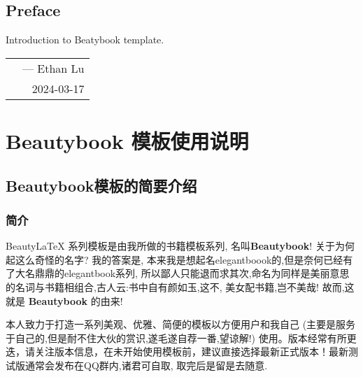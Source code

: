 \documentclass[lang=cn,zihao=-4,a4paper,fontset=windows]{beautybook}
\begin{document}
\frontmatter
{}

{%
\thispagestyle{empty}
\chapter*{Preface}
Introduction to Beatybook template.


\hfill
\begin{tabular}{lr}
    &--- Ethan Lu\\ 
    &2024-03-17
\end{tabular}
\clearpage}

\thispagestyle{empty}
\tableofcontents\let\cleardoublepage\clearpage


\mainmatter
{}

\part{\textbf{Beautybook} 模板使用说明}

\chapter{Beautybook模板的简要介绍}

\section{简介}

Beauty\LaTeX{} 系列模板是由我所做的书籍模板系列, 名叫\textbf{Beautybook}! 关于为何起这么奇怪的名字? 我的答案是, 本来我是想起名elegantboook的,但是奈何已经有了大名鼎鼎的elegantbook系列, 所以鄙人只能退而求其次,命名为同样是美丽意思的名词与书籍相组合,古人云:书中自有颜如玉,这不, 美女配书籍,岂不美哉! 故而,这就是 \textbf{Beautybook} 的由来!

本人致力于打造一系列美观、优雅、简便的模板以方便用户和我自己 (主要是服务于自己的,但是耐不住大伙的赏识,遂毛遂自荐一番,望谅解!) 使用。版本经常有所更迭，请关注版本信息，在未开始使用模板前，建议直接选择最新正式版本！最新测试版通常会发布在QQ群内,诸君可自取, 取完后是留是去随意.
\end{document}
